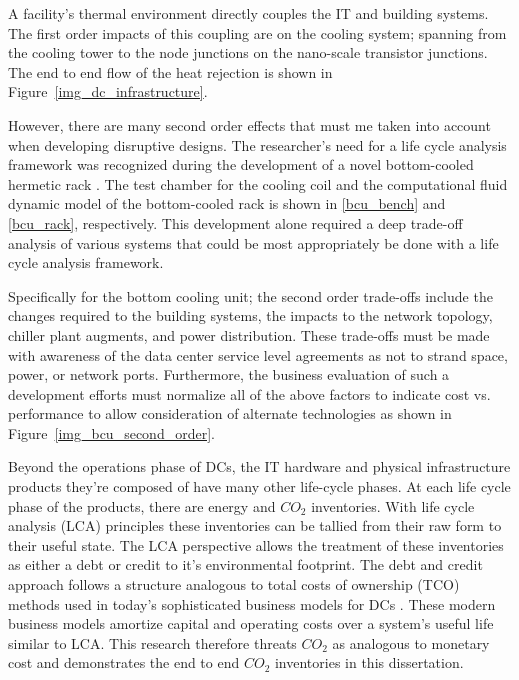     
    
    A facility's thermal environment directly couples the IT and building systems. The first order impacts of this coupling are on the cooling system; spanning from the cooling tower to the node junctions on the nano-scale transistor junctions. The end to end flow of the heat rejection is shown in Figure~\ref{img_dc_infrastructure}. 
    
    
    
    However, there are many second order effects that must me taken into account when developing disruptive designs. The researcher's need for a life cycle analysis framework was recognized during the development of a novel bottom-cooled hermetic rack \cite{gao16}. The test chamber for the cooling coil and the computational fluid dynamic model of the bottom-cooled rack is shown in \ref{bcu_bench} and \ref{bcu_rack}, respectively. This development alone required a deep trade-off analysis of various systems that could be most appropriately be done with a life cycle analysis framework. 
    
    
    
    Specifically for the bottom cooling unit; the second order trade-offs include the changes required to the building systems, the impacts to the network topology, chiller plant augments, and power distribution. These trade-offs must be made with awareness of the data center service level agreements as not to strand space, power, or network ports. Furthermore, the business evaluation of such a development efforts must normalize all of the above factors to indicate cost vs. performance to allow consideration of alternate technologies as shown in Figure~\ref{img_bcu_second_order}.
    
    
    
    Beyond the operations phase of DCs, the IT hardware and physical infrastructure products they're composed of have many other life-cycle phases. At each life cycle phase of the products, there are energy and $CO_2$ inventories. With life cycle analysis (LCA) principles these inventories can be tallied from their raw form to their useful state.  The LCA perspective allows the treatment of these inventories as either a debt or credit to it's environmental footprint. The debt and credit approach follows a structure analogous to total costs of ownership (TCO) methods used in today's sophisticated business models for DCs \cite{Hardy12}. These modern business models amortize capital and operating costs over a system's useful life similar to LCA. This research therefore threats $CO_2$ as analogous to monetary cost and demonstrates the end to end $CO_2$ inventories in this dissertation.
    
